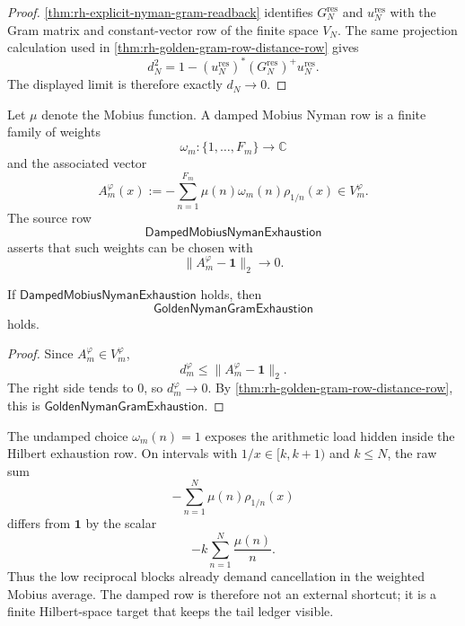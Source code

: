 \begin{proof}
\autoref{thm:rh-explicit-nyman-gram-readback} identifies
$G_N^{\mathrm{res}}$ and $u_N^{\mathrm{res}}$ with the Gram matrix and
constant-vector row of the finite space $V_N$.  The same projection
calculation used in
\autoref{thm:rh-golden-gram-row-distance-row} gives
$$
d_N^2
=
1-(u_N^{\mathrm{res}})^\ast
(G_N^{\mathrm{res}})^+
u_N^{\mathrm{res}}.
$$
The displayed limit is therefore exactly $d_N\to0$.
\end{proof}

\begin{definition}
\label{def:rh-damped-mobius-nyman-exhaustion}
Let $\mu$ denote the Mobius function.  A damped Mobius Nyman row is a
finite family of weights
$$
\omega_m:\{1,\ldots,F_m\}\to\mathbb C
$$
and the associated vector
$$
A_m^{\varphi}(x)
:=
-
\sum_{n=1}^{F_m}
\mu(n)\omega_m(n)\rho_{1/n}(x)
\in V_m^{\varphi}.
$$
The source row
$$
\mathsf{DampedMobiusNymanExhaustion}
$$
asserts that such weights can be chosen with
$$
\|A_m^{\varphi}-\mathbf 1\|_2\to0.
$$
\end{definition}

\begin{theorem}
\label{thm:rh-damped-mobius-exhaustion-gives-golden-gram-exhaustion}
If $\mathsf{DampedMobiusNymanExhaustion}$ holds, then
$$
\mathsf{GoldenNymanGramExhaustion}
$$
holds.
\end{theorem}

\begin{proof}
Since $A_m^{\varphi}\in V_m^{\varphi}$,
$$
d_m^{\varphi}
\le
\|A_m^{\varphi}-\mathbf 1\|_2.
$$
The right side tends to $0$, so $d_m^{\varphi}\to0$.  By
\autoref{thm:rh-golden-gram-row-distance-row}, this is
$\mathsf{GoldenNymanGramExhaustion}$.
\end{proof}

\begin{principle}
\label{prin:rh-mobius-truncation-obstruction-detector}
The undamped choice $\omega_m(n)=1$ exposes the arithmetic load hidden
inside the Hilbert exhaustion row.  On intervals with $1/x\in[k,k+1)$
and $k\le N$, the raw sum
$$
-
\sum_{n=1}^{N}\mu(n)\rho_{1/n}(x)
$$
differs from $\mathbf 1$ by the scalar
$$
-
k\sum_{n=1}^{N}\frac{\mu(n)}{n}.
$$
Thus the low reciprocal blocks already demand cancellation in the
weighted Mobius average.  The damped row is therefore not an external
shortcut; it is a finite Hilbert-space target that keeps the tail
ledger visible.
\end{principle}


